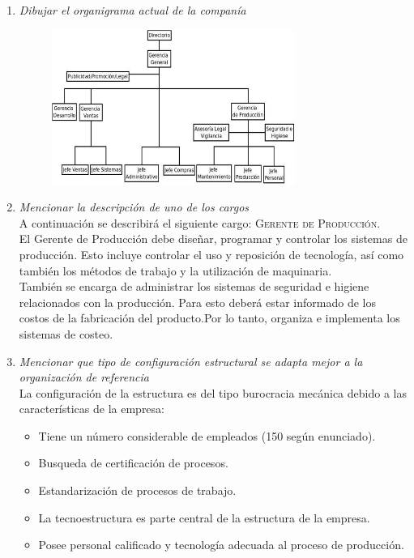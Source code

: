\documentclass[a4paper,10pt]{article}
\begin{document}
\begin{enumerate}
			\item \textit{Dibujar el organigrama actual de la companía}\\
			\begin{figure}[!h]
			\includegraphics[width=0.75\textwidth]{imagenes/orgaLosGringos.png}
			\end{figure}			
			\item \textit{Mencionar la descripción de uno de los cargos}\\
			A continuaci\'on se describir\'a el siguiente cargo: \textsc{Gerente de Producción}.\\
			El Gerente de Producción debe diseñar, programar y controlar los sistemas de producción. Esto incluye controlar el uso y reposición de tecnología, así como también los métodos de trabajo y la utilización de maquinaria.\\
Tambi\'en se encarga de administrar los sistemas de seguridad e higiene relacionados con la producci\'on. Para esto deber\'a estar informado de los costos de la fabricación del producto.Por lo tanto, organiza e implementa los sistemas de costeo.
			\item \textit{Mencionar que tipo de configuración estructural se adapta mejor a la organización de referencia}\\
			La configuración de la estructura es del tipo burocracia mecánica debido a las características de la empresa:
			\begin{itemize}
			\item Tiene un número considerable de empleados (150 seg\'un enunciado).			
			\item Busqueda de certificación de procesos.
			\item Estandarización de procesos de trabajo.
			\item La tecnoestructura es parte central de la estructura de la empresa.
			\item Posee personal calificado y tecnología adecuada al proceso de producción.			
			\end{itemize}


\end{enumerate}
\end{document}
